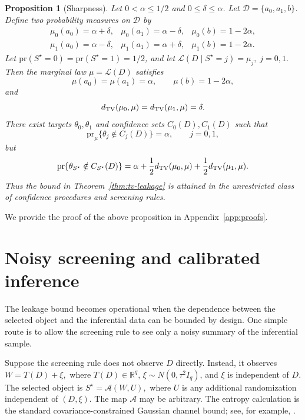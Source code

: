 \documentclass[11pt]{article}
\newtheorem{proposition}{Proposition}
\newcommand{\Rr}{\mathbb R}
\newcommand{\calA}{\mathcal A}
\begin{document}
\begin{proposition}[Sharpness]
	\label{prop:sharpness}
	Let \(0<\alpha\leq 1/2\) and \(0\leq\delta\leq\alpha\). Let
	\(\mathcal D=\{a_0,a_1,b\}\). Define two probability measures on \(\mathcal D\)
	by
	\[
	\begin{array}{lll}
		\mu_0(a_0)=\alpha+\delta, &
		\mu_0(a_1)=\alpha-\delta, &
		\mu_0(b)=1-2\alpha,\\[2mm]
		\mu_1(a_0)=\alpha-\delta, &
		\mu_1(a_1)=\alpha+\delta, &
		\mu_1(b)=1-2\alpha .
	\end{array}
	\]
	Let \(\mathrm{pr}(S^\star=0)=\mathrm{pr}(S^\star=1)=1/2\), and let
	$
	\mathcal L(D\mid S^\star=j)=\mu_j,\;j=0,1.
	$
	Then the marginal law \(\mu=\mathcal L(D)\) satisfies
	\[
	\mu(a_0)=\mu(a_1)=\alpha,\qquad \mu(b)=1-2\alpha,
	\]
	and
	\[
	d_{\rm TV}(\mu_0,\mu)=d_{\rm TV}(\mu_1,\mu)=\delta.
	\]
	There exist targets \(\theta_0,\theta_1\) and confidence sets \(C_0(D),C_1(D)\)
	such that
	\[
	\mathrm{pr}_{\mu}\{\theta_j\notin C_j(D)\}=\alpha,\qquad j=0,1,
	\]
	but
	\[
	\mathrm{pr}\{\theta_{S^\star}\notin C_{S^\star}(D)\}
	=
	\alpha+
	\frac12 d_{\rm TV}(\mu_0,\mu)
	+
	\frac12 d_{\rm TV}(\mu_1,\mu).
	\]
	Thus the bound in Theorem~\ref{thm:tv-leakage} is attained in the unrestricted
	class of confidence procedures and screening rules.
\end{proposition}

We provide the proof of the above proposition in Appendix~\ref{app:proofs}.


\section{Noisy screening and calibrated inference}
\label{sec:noisy}

The leakage bound becomes operational when the dependence between the selected object and the inferential data can be bounded by design. One simple route is to allow the screening rule to see only a noisy summary of the inferential sample.

Suppose the screening rule does not observe \(D\) directly. Instead, it observes $W=T(D)+\xi,$ where \(T(D)\in\Rr^q\), \(\xi\sim N(0,\tau^2 I_q)\), and \(\xi\) is independent of \(D\). The selected object is
$S^\star=\calA(W,U),$ where \(U\) is any additional randomization independent of \((D,\xi)\). The map \(\calA\) may be arbitrary. The entropy calculation is the standard covariance-constrained Gaussian channel bound; see, for example, \citet[Chapter~9]{cover2006elements}.
\end{document}
